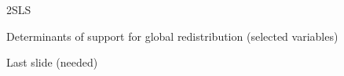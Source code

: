 \documentclass[aspectratio=169,xcolor=dvipsnames, 11pt,mathserif]{beamer}
\begin{document}
\begin{frame}{2SLS\label{2SLS}  \hyperlink{warm_glow}{}}  
  \small 
\end{frame}

\begin{frame}{Determinants of support for global redistribution (selected variables)\label{determinants}  \hyperlink{gcs}{}}  
      \vspace{-.18cm}
    \begin{table}[h]
        \makebox[\textwidth][c]{
            \resizebox*{!}{.97\textheight}{
            
            }
        }
    \end{table} 
\end{frame}

\begin{frame}{Last slide (needed)}
  \end{frame}
\end{document}
